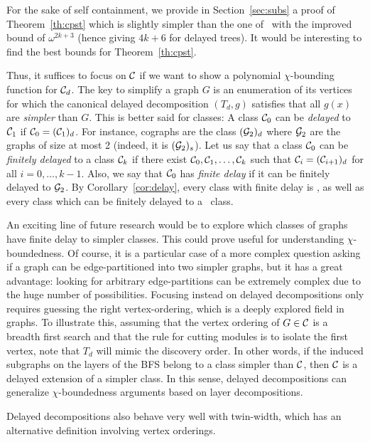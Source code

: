 For the sake of self containment, we  provide in Section~\ref{sec:subs} a proof of Theorem~\ref{th:cpst} which is slightly simpler than the one of~\cite{CPST13} with the improved bound of $\omega^{2k+3}$ (hence giving $4k+6$ for delayed trees). It would be interesting to find the best bounds for Theorem~\ref{th:cpst}.

Thus, it suffices to focus on $\cal C$ if we want to show a polynomial $\chi$-bounding function for ${\cal C}_d$. The key to simplify a graph $G$ is an enumeration of its vertices for which the canonical delayed decomposition $(T_d,g)$ satisfies that all $g(x)$ are \emph{simpler} than $G$. This is better said for classes: A class ${\cal C}_0$ can be \emph{delayed} to ${\cal C}_1$ if ${\cal C}_0=({{\cal C}_1})_d$. For instance, cographs are the class $({{\cal G}_2})_d$ where ${\cal G}_2$ are the graphs of size at most 2 (indeed, it is $({{\cal G}_2})_s$). Let us say that a class ${\cal C}_0$ can be \emph{finitely delayed} to a class ${\cal C}_k$ if there exist ${\cal C}_0, {\cal C}_1,\dots ,{\cal C}_k$ such that ${\cal C}_i=({{\cal C}_{i+1}})_d$ for all $i=0,\dots ,k-1$. Also, we say that ${\cal C}_0$ has \emph{finite delay} if it can be finitely delayed to ${\cal G}_2$. By Corollary~\ref{cor:delay}, every class with finite delay is \pcb, as well as every class which can be finitely delayed to a \pcb~class. 

An exciting line of future research would be to explore which classes of graphs have finite delay to simpler classes. This could prove useful for understanding $\chi$-boundedness. Of course, it is a particular case of a more complex question asking if a graph can be edge-partitioned into two simpler graphs, but it has a great advantage: looking for arbitrary edge-partitions can be extremely complex due to the huge number of possibilities. Focusing instead on delayed decompositions only requires guessing the right vertex-ordering, which is a deeply explored field in graphs. To illustrate this, assuming that the vertex ordering of $G\in \cal C$ is a breadth first search and that the rule for cutting modules is to isolate the first vertex, note that $T_d$ will mimic the discovery order. In other words, if the induced subgraphs on the layers of the BFS belong to a  class simpler than $\cal C$, then $\cal C$ is a delayed extension of a simpler class. In this sense, delayed decompositions can generalize $\chi$-boundedness arguments based on layer decompositions.



Delayed decompositions also behave very well with twin-width, which has an alternative definition involving vertex orderings.





